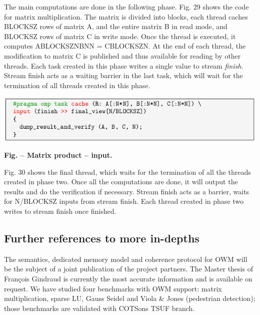 \documentclass[a4paper]{article}
\newcounter{Figure}
\renewcommand\theFigure{\arabic{Figure}}
\begin{document}
{
The main computations are done in the following phase. Fig. 29 shows the
code for matrix multiplication. The matrix is divided into blocks, each
thread caches BLOCKSZ rows of matrix A, and the entire matrix B in read
mode, and BLOCKSZ rows of matrix C in write mode. Once the thread is
executed, it computes
ABLOCKSZ{\textbullet}N{\textbullet}BN{\textbullet}N =
CBLOCKSZ{\textbullet}N. At the end of each thread, the modification to
matrix C is published and thus available for reading by other threads.
Each task created in this phase writes a single value to stream
\textit{finish}. Stream finish acts as a waiting barrier in the last
task, which will wait for the termination of all threads created in
this phase.}

{\centering 
\includegraphics[width=5.361in,height=0.9071in]{img46.png}
\par}

{\centering{}\sffamily\bfseries
\label{bkm:Ref388170857}Fig.
\stepcounter{Figure}{\theFigure} -- Matrix product -- input.
\par}

{
Fig. 30 shows the final thread, which waits for the termination of all
the threads created in phase two. Once all the computations are done,
it will output the results and do the verification if necessary. Stream
finish acts as a barrier, waits for N/BLOCKSZ inputs from stream
finish. Each thread created in phase two writes to stream finish once
finished.}

\subsection[Further references to more in{}-depths]{Further references
to more in-depths}
{
The semantics, dedicated memory model and coherence protocol for OWM
will be the subject of a joint publication of the project partners. The
Master thesis of Fran\c{c}ois Gindraud is currently the most accurate
information and is available on request. We have studied four
benchmarks with OWM support: matrix multiplication, sparse LU, Gauss
Seidel and Viola \& Jones (pedestrian detection); those benchmarks are
validated with COTSon{\textquotesingle}s TSUF branch.}
\end{document}
